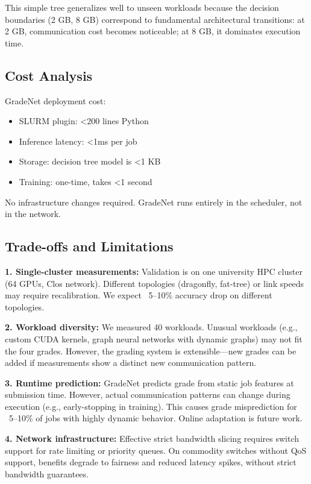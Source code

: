 \documentclass[conference]{IEEEtran}
\begin{document}
This simple tree generalizes well to unseen workloads because the decision boundaries (2 GB, 8 GB) correspond to fundamental architectural transitions: at 2 GB, communication cost becomes noticeable; at 8 GB, it dominates execution time.

\subsection{Cost Analysis}

GradeNet deployment cost:
\begin{itemize}
\item SLURM plugin: <200 lines Python
\item Inference latency: <1ms per job
\item Storage: decision tree model is <1 KB
\item Training: one-time, takes <1 second
\end{itemize}

No infrastructure changes required. GradeNet runs entirely in the scheduler, not in the network.

\subsection{Trade-offs and Limitations}

\textbf{1. Single-cluster measurements:} Validation is on one university HPC cluster (64 GPUs, Clos network). Different topologies (dragonfly, fat-tree) or link speeds may require recalibration. We expect ~5--10\% accuracy drop on different topologies.

\textbf{2. Workload diversity:} We measured 40 workloads. Unusual workloads (e.g., custom CUDA kernels, graph neural networks with dynamic graphs) may not fit the four grades. However, the grading system is extensible---new grades can be added if measurements show a distinct new communication pattern.

\textbf{3. Runtime prediction:} GradeNet predicts grade from static job features at submission time. However, actual communication patterns can change during execution (e.g., early-stopping in training). This causes grade misprediction for ~5--10\% of jobs with highly dynamic behavior. Online adaptation is future work.

\textbf{4. Network infrastructure:} Effective strict bandwidth slicing requires switch support for rate limiting or priority queues. On commodity switches without QoS support, benefits degrade to fairness and reduced latency spikes, without strict bandwidth guarantees.
\end{document}
